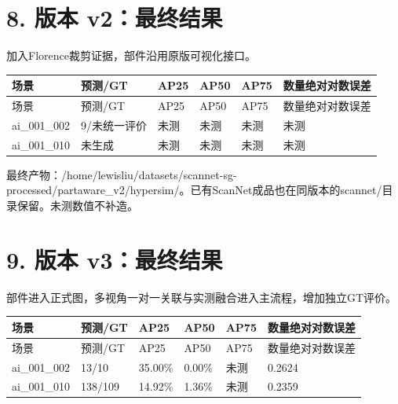 \documentclass[UTF8,fontset=fandol]{ctexart}
\begin{document}
\section*{8. 版本 v2：最终结果}

加入Florence裁剪证据，部件沿用原版可视化接口。



{\small
\begin{longtable}{|p{}|p{}|p{}|p{}|p{}|p{}|}
\hline
场景 & 预测/GT & AP25 & AP50 & AP75 & 数量绝对对数误差 \\ \hline
\endfirsthead
\hline
场景 & 预测/GT & AP25 & AP50 & AP75 & 数量绝对对数误差 \\ \hline
\endhead
ai\_001\_002 & 9/未统一评价 & 未测 & 未测 & 未测 & 未测 \\ \hline
ai\_001\_010 & 未生成 & 未测 & 未测 & 未测 & 未测 \\ \hline
\end{longtable}
}

最终产物：/home/lewisliu/datasets/scannet-sg-processed/partaware\_v2/hypersim/。已有ScanNet成品也在同版本的scannet/目录保留。未测数值不补造。



\section*{9. 版本 v3：最终结果}

部件进入正式图，多视角一对一关联与实测融合进入主流程，增加独立GT评价。



{\small
\begin{longtable}{|p{}|p{}|p{}|p{}|p{}|p{}|}
\hline
场景 & 预测/GT & AP25 & AP50 & AP75 & 数量绝对对数误差 \\ \hline
\endfirsthead
\hline
场景 & 预测/GT & AP25 & AP50 & AP75 & 数量绝对对数误差 \\ \hline
\endhead
ai\_001\_002 & 13/10 & 35.00\% & 0.00\% & 未测 & 0.2624 \\ \hline
ai\_001\_010 & 138/109 & 14.92\% & 1.36\% & 未测 & 0.2359 \\ \hline
\end{longtable}
}
\end{document}
